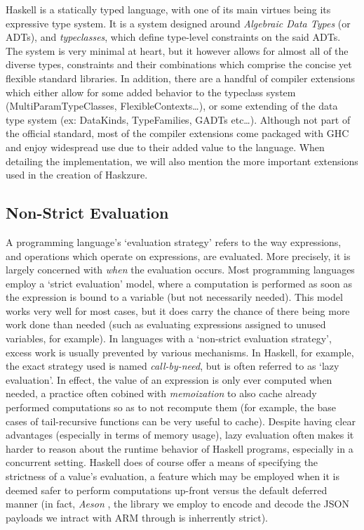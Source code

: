 \documentclass[11pt]{report}
\begin{document}
Haskell is a statically typed language, with one of its main virtues being
its expressive type system. It is a system designed around
\textit{Algebraic Data Types} (or ADTs), and \textit{typeclasses}, which
define type-level constraints on the said ADTs. The system is very minimal
at heart, but it however allows for almost all of the diverse types,
constraints and their combinations which comprise the concise yet flexible
standard libraries. \newline
In addition, there are a handful of compiler extensions which either allow for
some added behavior to the typeclass system (MultiParamTypeClasses,
FlexibleContexts\ldots), or some extending of the data type system (ex:
DataKinds, TypeFamilies, GADTs etc\ldots). Although not part of the official standard,
most of the compiler extensions come packaged with GHC and enjoy widespread
use due to their added value to the language. When detailing the
implementation, we will also mention the more important extensions used in the
creation of Haskzure.

\subsection{Non-Strict Evaluation}

A programming language's `evaluation strategy' refers to the way expressions,
and operations which operate on expressions, are evaluated. More precisely, it is
largely concerned with \textit{when} the evaluation occurs. Most programming
languages employ a `strict evaluation' model, where a computation is performed
as soon as the expression is bound to a variable (but not necessarily
needed). This model works very well for most cases, but it does
carry the chance of there being more work done than needed (such as evaluating
expressions assigned to unused variables, for example). \newline
In languages with a `non-strict evaluation strategy', excess work is usually
prevented by various mechanisms. In Haskell, for example, the exact strategy
used is named \textit{call-by-need}, but is often referred to as `lazy
evaluation'. In effect, the value of an expression is only ever computed when
needed, a practice often cobined with \textit{memoization} to also cache
already performed computations so as to not recompute them (for example, the
base cases of tail-recursive functions can be very useful to cache). \newline
Despite having clear advantages (especially in terms of memory usage), lazy
evaluation often makes it harder to reason about the runtime behavior of
Haskell programs, especially in a concurrent \cite{concurrenthaskell} setting.
Haskell does of course offer a means of specifying the strictness of a value's
evaluation, a feature which may be employed when it is deemed safer to perform
computations up-front versus the default deferred manner (in fact,
\textit{Aeson} \cite{aeson}, the library we employ to encode and decode the
JSON payloads we intract with ARM through is inherrently strict).
\end{document}
